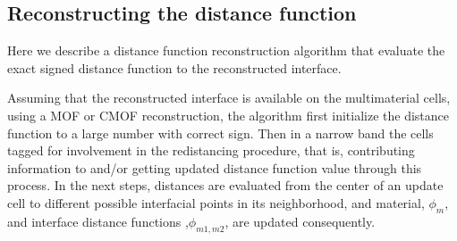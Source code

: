 \documentclass[]{article}
\begin{document}
\subsection{Reconstructing the distance function \label{MMRECON}}
Here we describe a distance function reconstruction algorithm that evaluate the exact signed distance function to the reconstructed interface.

Assuming that the reconstructed interface is available on the multimaterial cells, using a MOF or CMOF reconstruction, the algorithm first initialize the distance function to a large number with correct sign. Then in a narrow band the cells tagged for involvement in the redistancing procedure, that is, contributing information to and/or getting updated distance function value through this process. In the next steps, distances are evaluated from the center of an update cell to different possible interfacial points in its neighborhood, and material, $\phi_m$, and interface distance functions ,$\phi_{m1,m2}$, are updated consequently.
\end{document}
